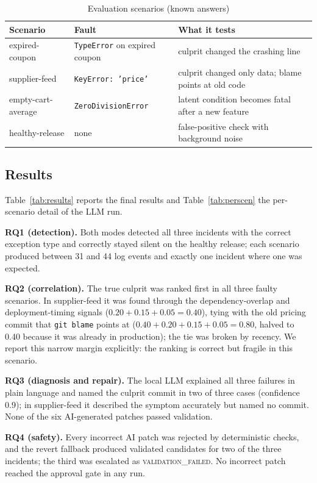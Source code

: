 \documentclass[conference]{IEEEtran}
\begin{document}
\begin{table}[t]
\centering
\caption{Evaluation scenarios (known answers)}
\label{tab:scen}
\footnotesize
\begin{tabular}{@{}p{1.75cm}p{2.25cm}p{3.75cm}@{}}
\toprule
Scenario & Fault & What it tests \\
\midrule
expired-coupon & \texttt{TypeError} on expired coupon & culprit changed the crashing line \\
supplier-feed & \texttt{KeyError: 'price'} & culprit changed only data; blame points at old code \\
empty-cart-average & \texttt{ZeroDivision}\-\texttt{Error} & latent condition becomes fatal after a new feature \\
healthy-release & none & false-positive check with background noise \\
\bottomrule
\end{tabular}
\end{table}

\subsection{Results}
Table~\ref{tab:results} reports the final results and Table~\ref{tab:perscen} the per-scenario detail of the LLM run.

\textbf{RQ1 (detection).} Both modes detected all three incidents with the correct exception type and correctly stayed silent on the healthy release; each scenario produced between 31 and 44 log events and exactly one incident where one was expected.

\textbf{RQ2 (correlation).} The true culprit was ranked first in all three faulty scenarios. In supplier-feed it was found through the dependency-overlap and deployment-timing signals ($0.20+0.15+0.05=0.40$), tying with the old pricing commit that \texttt{git blame} points at ($0.40+0.20+0.15+0.05=0.80$, halved to 0.40 because it was already in production); the tie was broken by recency. We report this narrow margin explicitly: the ranking is correct but fragile in this scenario.

\textbf{RQ3 (diagnosis and repair).} The local LLM explained all three failures in plain language and named the culprit commit in two of three cases (confidence 0.9); in supplier-feed it described the symptom accurately but named no commit. None of the six AI-generated patches passed validation.

\textbf{RQ4 (safety).} Every incorrect AI patch was rejected by deterministic checks, and the revert fallback produced validated candidates for two of the three incidents; the third was escalated as \textsc{validation\_failed}. No incorrect patch reached the approval gate in any run.
\end{document}
